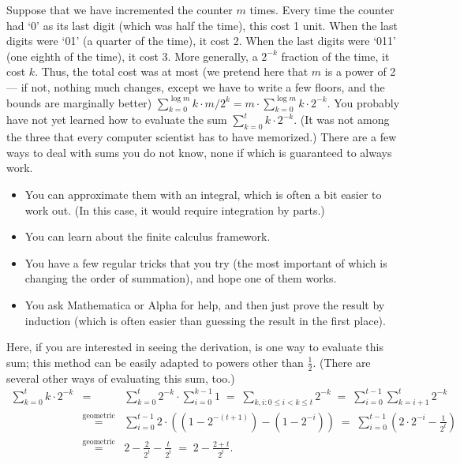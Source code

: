 Suppose that we have incremented the counter $m$ times. 
Every time the counter had `0' as its last digit
(which was half the time), this cost 1 unit.
When the last digits were `01' (a quarter of the time), it cost 2.
When the last digits were `011' (one eighth of the time), it cost 3.
More generally, a $2^{-k}$ fraction of the time, it cost $k$.
Thus, the total cost was at most
(we pretend here that $m$ is a power of 2 ---
if not, nothing much changes, except we have to write a few floors,
and the bounds are marginally better)
$\sum_{k=0}^{\log m} k \cdot m/2^{k} 
= m \cdot \sum_{k=0}^{\log m} k \cdot 2^{-k}$. 
You probably have not yet learned how to evaluate the sum
$\sum_{k=0}^t k \cdot 2^{-k}$.
(It was not among the three that every computer scientist has to have memorized.)
There are a few ways to deal with sums you do not know,
none if which is guaranteed to always work. 
\begin{itemize}
\item You can approximate them with an integral, which is often a bit
  easier to work out.
  (In this case, it would require integration by parts.)
\item You can learn about the finite calculus framework.
\item You have a few regular tricks that you try
  (the most important of which is changing the order of summation),
  and hope one of them works.
\item You ask Mathematica or Alpha for help,
  and then just prove the result by induction
  (which is often easier than guessing the result in the first place).
\end{itemize}

Here, if you are interested in seeing the derivation,
is one way to evaluate this sum; this method can be
easily adapted to powers other than $\frac{1}{2}$.
(There are several other ways of evaluating this sum, too.)
\[ \begin{array}{lcl}
\sum_{k=0}^{t} k \cdot 2^{-k}
& = & \sum_{k=0}^{t} 2^{-k} \cdot \sum_{i=0}^{k-1} 1
\; = \; \sum_{k,i: 0 \leq i < k \leq t} 2^{-k}
\; = \; \sum_{i=0}^{t - 1} \sum_{k=i+1}^{t} 2^{-k}\\
& \stackrel{\mbox{geometric series}}{=} &
  \sum_{i=0}^{t - 1} 2 \cdot ((1-2^{-(t + 1)}) - (1-2^{-i}))
\; = \; \sum_{i=0}^{t - 1} (2\cdot 2^{-i} - \frac{1}{2^t})\\
& \stackrel{\mbox{geometric series}}{=} &
  2 - \frac{2}{2^t} - \frac{t}{2^t}
\; = \; 2 - \frac{2+t}{2^t}.
\end{array} \]

